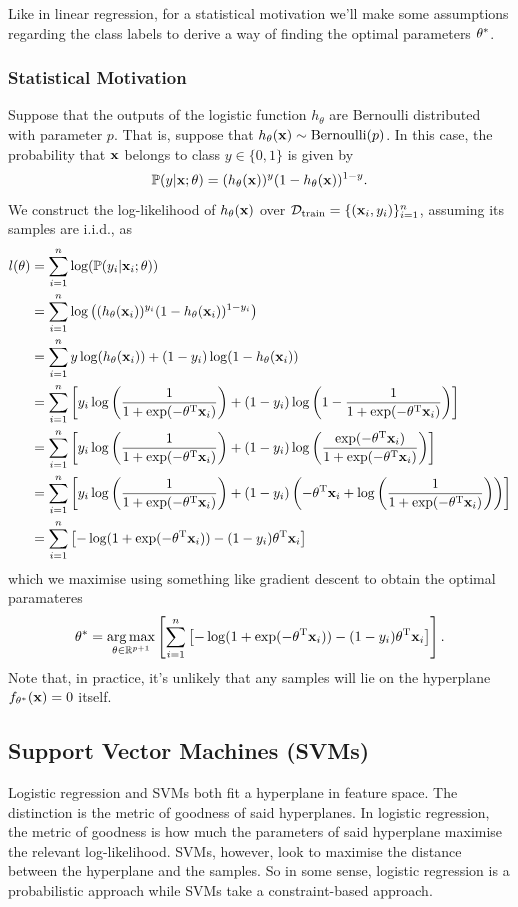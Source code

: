 \documentclass[11pt]{article}
\begin{document}
\noindent Like in linear regression, for a statistical motivation we'll make some assumptions regarding the class labels to derive a way of finding the optimal parameters $\theta^{*}$.

\subsubsection{Statistical Motivation}
Suppose that the outputs of the logistic function $h_{\theta}$ are Bernoulli distributed with parameter $p$. That is, suppose that $h_{\theta}(\mathbf{x})\sim\text{Bernoulli}(p)$. In this case, the probability that $\mathbf{x}$ belongs to class $y\in\{0, 1\}$ is given by
$$
\mathbb{P}(y|\mathbf{x};\theta)=(h_{\theta}(\mathbf{x}))^{y}(1-h_{\theta}(\mathbf{x}))^{1-y}.
$$
We construct the log-likelihood of $h_{\theta}(\mathbf{x})$ over $\mathcal{D}_{\text{train}}=\{(\mathbf{x}_i,y_i)\}_{i=1}^n$, assuming its samples are i.i.d., as
\begin{align*}
    l(\theta)
    &=
    \sum_{i=1}^n\log(\mathbb{P}(y_i|\mathbf{x}_i;\theta))\\
    &=
    \sum_{i=1}^n\log\left((h_{\theta}(\mathbf{x}_i))^{y_i}(1-h_{\theta}(\mathbf{x}_i))^{1-y_i}\right)\\
    &=
    \sum_{i=1}^ny\log(h_{\theta}(\mathbf{x}_i))+(1-y_i)\log(1-h_{\theta}(\mathbf{x}_i))\\
    &=
    \sum_{i=1}^n\left[y_i\log\left(\frac{1}{1+\exp(-\theta^{\text{T}}\mathbf{x}_i)}\right)+(1-y_i)\log\left(1-\frac{1}{1+\exp(-\theta^{\text{T}}\mathbf{x}_i)}\right)\right]\\
    &=
    \sum_{i=1}^n\left[y_i\log\left(\frac{1}{1+\exp(-\theta^{\text{T}}\mathbf{x}_i)}\right)+(1-y_i)\log\left(\frac{\exp(-\theta^{\text{T}}\mathbf{x}_i)}{1+\exp(-\theta^{\text{T}}\mathbf{x}_i)}\right)\right]\\
    &=
    \sum_{i=1}^n\left[y_i\log\left(\frac{1}{1+\exp(-\theta^{\text{T}}\mathbf{x}_i)}\right)+(1-y_i)\left(-\theta^{\text{T}}\mathbf{x}_i+\log\left(\frac{1}{1+\exp(-\theta^{\text{T}}\mathbf{x}_i)}\right)\right)\right]\\
    &=
    \sum_{i=1}^n\left[-\log(1+\exp(-\theta^{\text{T}}\mathbf{x}_i))-(1-y_i)\theta^{\text{T}}\mathbf{x}_i\right]
\end{align*}
which we maximise using something like gradient descent to obtain the optimal paramateres
$$
\theta^{*}
=
\operatorname*{arg\,max}_{\theta\in\mathbb{R}^{p+1}}\left[\sum_{i=1}^n\left[-\log(1+\exp(-\theta^{\text{T}}\mathbf{x}_i))-(1-y_i)\theta^{\text{T}}\mathbf{x}_i\right]\right].
$$
Note that, in practice, it's unlikely that any samples will lie on the hyperplane $f_{\theta^*}(\mathbf{x})=0$ itself.

\subsection{Support Vector Machines (SVMs)}
Logistic regression and SVMs both fit a hyperplane in feature space. The distinction is the metric of goodness of said hyperplanes. In logistic regression, the metric of goodness is how much the parameters of said hyperplane maximise the relevant log-likelihood. SVMs, however, look to maximise the distance between the hyperplane and the samples. So in some sense, logistic regression is a probabilistic approach while SVMs take a constraint-based approach.
\end{document}
